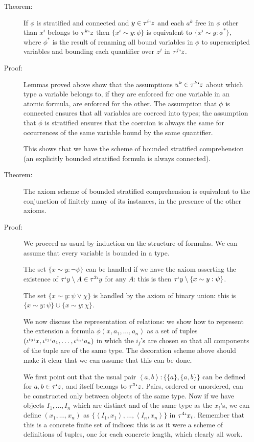 \documentclass[12pt]{article}
\begin{document}
\begin{description}

\item[Theorem:]  If $\phi$ is stratified and connected and $y \in \tau^i`z$ and each $a^k$ free in $\phi$ other than $x^i$ belongs to $\tau^k`z$ then $\{x^i \sim y:\phi\}$ is equivalent to $\{x^i \sim y:\phi^*\}$, where
$\phi^*$ is the result of renaming all bound variables in $\phi$ to superscripted variables and  bounding each quantifier over $z^j$ in $\tau^j`z$.

\item[Proof:]  Lemmas proved above show that the assumptions $u^k \in \tau^k`z$ about which type a variable belongs to, if they are enforced for one variable in an atomic formula, are enforced
for the other.  The assumption that $\phi$ is connected ensures that all variables are coerced into types;  the assumption that $\phi$ is stratified ensures that the coercion is always the same for occurrences of the same variable bound by the same quantifier.

This shows that we have the scheme of bounded stratified comprehension (an explicitly bounded stratified formula is always connected).


\item[Theorem:]  The axiom scheme of bounded stratified comprehension is equivalent to the conjunction of finitely many of its instances,  in the presence of the other axioms.

\item[Proof:]  We proceed as usual by induction on the structure of formulas.  We can assume that every variable is bounded in a type. 

The set $\{x \sim y:\neg \psi\}$ can be handled if we have the axiom asserting the existence of $\tau`y \setminus A \in \tau^2`y$ for any $A$:  this is then
$\tau`y \setminus \{x \sim y:\psi\}$.

The set $\{x \sim y:\psi \vee \chi\}$ is handled by the axiom of binary union:  this is $\{x \sim y:\psi\} \cup \{x \sim y:\chi\}$.

We now discuss the representation of relations:  we show how to represent the extension a formula $\phi(x,a_1,\ldots,a_n)$ as a set of tuples $(\iota^{i_0}`x,\iota^{i_1}`a_1,\ldots,\iota^{i_n}`a_n)$
in which the $i_j$'s are chosen so that all components of the tuple are of the same type.  The decoration scheme above should make it clear that we can assume that this can be done.

We first point out that the usual pair $\left<a,b\right>:\{\{a\},\{a,b\}\}$ can be defined for $a,b \in \tau`z$, and itself belongs to $\tau^3`z$.  Pairs, ordered or unordered,
can be constructed only between objects of the same type.  Now if we have objects $I_1,\ldots,I_n$ which are distinct and of the same type as the $x_i$'s, we
can define $(x_1,\ldots,x_n)$ as $\{\left<I_1,x_1\right>,\ldots,\left<I_n,x_n\right>\}$ in $\tau^4`x_i$.  Remember that this is a concrete finite set of indices:  this is as it were
a scheme of definitions of tuples, one for each concrete length, which clearly all work.


\end{description}
\end{document}

